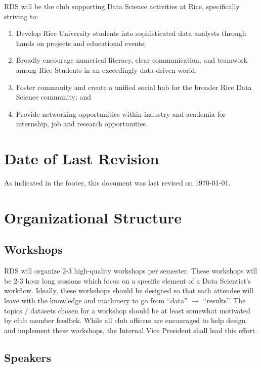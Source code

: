 \documentclass[12pt]{article}
\begin{document}
RDS will be the club supporting Data Science activities at Rice, specifically 
striving to:
\begin{enumerate} 

  \item Develop Rice University students into sophisticated data analysts
    through hands on projects and educational events;

  \item Broadly encourage numerical literacy, clear communication, and
    teamwork among Rice Students in an exceedingly data-driven world;
  
  \item Foster community and create a unified social hub for the broader Rice
    Data Science community; and
  
  \item Provide networking opportunities within industry and academia for
    internship, job and research opportunities.

\end{enumerate}


\section{Date of Last Revision}

As indicated in the footer, this document was last revised on \today.

\section{Organizational Structure}

\subsection{Workshops}

RDS will organize 2-3 high-quality workshops per semester.  These workshops
will be 2-3 hour long sessions which focus on a specific element of a Data
Scientist's workflow.  Ideally, these workshops should be designed so that each
attendee will leave with the knowledge and machinery to go from ``data''
$\rightarrow$ ``results''.  The topics / datasets chosen for a workshop should
be at least somewhat motivated by club member feedbck.  While all club officers
are encouraged to help design and implement these workshops, the Internal Vice
President shall lead this effort.

\subsection{Speakers}
\end{document}
